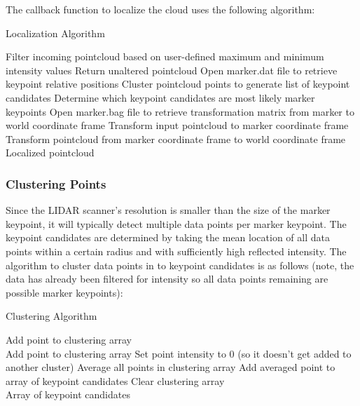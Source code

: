 The callback function to localize the cloud uses the following algorithm:
\begin{algorithm}[H]
\caption{Localization Algorithm}
\label{alg:localize}
\begin{algorithmic}[1]
\begin{raggedright}
\State Filter incoming pointcloud based on user-defined maximum and minimum intensity values
\State Return unaltered pointcloud
\Else
\State Open marker.dat file to retrieve keypoint relative positions
\State Cluster pointcloud points to generate list of keypoint candidates
\State Determine which keypoint candidates are most likely marker keypoints
\State Open marker.bag file to retrieve transformation matrix from marker to world coordinate frame
\State Transform input pointcloud to marker coordinate frame
\State Transform pointcloud from marker coordinate frame to world coordinate frame \EndIf
\EndFunction\\
\Return Localized pointcloud
\end{raggedright}
\end{algorithmic}
\end{algorithm}

\subsubsection{Clustering Points}
Since the LIDAR scanner's resolution is smaller than the size of the marker keypoint, it will typically detect multiple data points per marker keypoint. The keypoint candidates are determined by taking the mean location of all data points within a certain radius and with sufficiently high reflected intensity. The algorithm to cluster data points in to keypoint candidates is as follows (note, the data has already been filtered for intensity so all data points remaining are possible marker keypoints):

\begin{algorithm}[H]
\caption{Clustering Algorithm}
\label{alg:cluster}
\begin{algorithmic}[1]
\begin{raggedright}
\State Add point to clustering array
\\
\State Add point to clustering array
\State Set point intensity to 0 (so it doesn't get added to another cluster)
\EndIf
\EndFor
\State Average all points in clustering array
\State Add averaged point to array of keypoint candidates
\State Clear clustering array
\EndIf
\EndFor
\EndFunction\\
\Return Array of keypoint candidates
\end{raggedright}
\end{algorithmic}
\end{algorithm}
